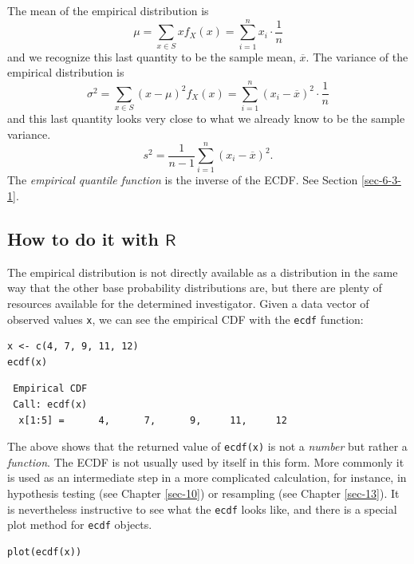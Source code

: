 \documentclass[captions=tableheading]{scrbook}
\begin{document}
The mean of the empirical distribution is
\begin{equation}
\mu=\sum_{x\in S}xf_{X}(x)=\sum_{i=1}^{n}x_{i}\cdot\frac{1}{n}
\end{equation}
and we recognize this last quantity to be the sample mean, \(\overline{x}\). The variance of the empirical distribution is
\begin{equation}
\sigma^{2}=\sum_{x\in S}(x-\mu)^{2}f_{X}(x)=\sum_{i=1}^{n}(x_{i}-\overline{x})^{2}\cdot\frac{1}{n}
\end{equation}
and this last quantity looks very close to what we already know to be the sample variance.
\begin{equation}
s^{2}=\frac{1}{n-1}\sum_{i=1}^{n}(x_{i}-\overline{x})^{2}.
\end{equation}
The \emph{empirical quantile function} is the inverse of the ECDF. See Section \ref{sec-6-3-1}.
\subsection{How to do it with \(\mathsf{R}\)}
\label{sec-5-5-1}


The empirical distribution is not directly available as a distribution in the same way that the other base probability distributions are, but there are plenty of resources available for the determined investigator.  Given a data vector of observed values \texttt{x}, we can see the empirical CDF with the \texttt{ecdf} function:


\begin{verbatim}
x <- c(4, 7, 9, 11, 12)
ecdf(x)
\end{verbatim}

\begin{verbatim}
 Empirical CDF 
 Call: ecdf(x)
  x[1:5] =      4,      7,      9,     11,     12
\end{verbatim}

The above shows that the returned value of \texttt{ecdf(x)} is not a \emph{number} but rather a \emph{function}. The ECDF is not usually used by itself in this form. More commonly it is used as an intermediate step in a more complicated calculation, for instance, in hypothesis testing (see Chapter \ref{sec-10}) or resampling (see Chapter \ref{sec-13}). It is nevertheless instructive to see what the \texttt{ecdf} looks like, and there is a special plot method for \texttt{ecdf} objects.


\begin{verbatim}
plot(ecdf(x))
\end{verbatim}
\end{document}
